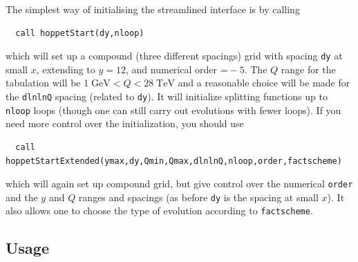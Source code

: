 \documentclass[12pt]{article}
\newcommand{\GeV}{\;\mathrm{GeV}}
\newcommand{\TeV}{\;\mathrm{TeV}}
\newcommand{\ttt}[1]{\texttt{#1}}
\begin{document}
The simplest way of initialising the 
streamlined interface is by calling
\begin{lstlisting}
  call hoppetStart(dy,nloop)
\end{lstlisting}
which will set up a compound (three different spacings) grid with
spacing \ttt{dy} at small $x$, extending to $y = 12$, and numerical
order $\ttt=-5$.  The $Q$ range for the tabulation will be $1\GeV <
Q<28 \TeV$ and a reasonable choice will be made for the \ttt{dlnlnQ}
spacing (related to \ttt{dy}). It will initialize splitting functions
up to \ttt{nloop} loops (though one can still carry out evolutions
with fewer loops).
%
If you need more control over the initialization, you should use
\begin{lstlisting}
  call hoppetStartExtended(ymax,dy,Qmin,Qmax,dlnlnQ,nloop,order,factscheme)
\end{lstlisting}
which will again set up compound grid, but give control over the
numerical \ttt{order} and the $y$ and $Q$ ranges and spacings (as
before \ttt{dy} is the spacing at small $x$). It also allows one to
choose the type of evolution according to \ttt{factscheme}.


\subsection{Usage}
\label{sec:vanilla_usage}
\end{document}
